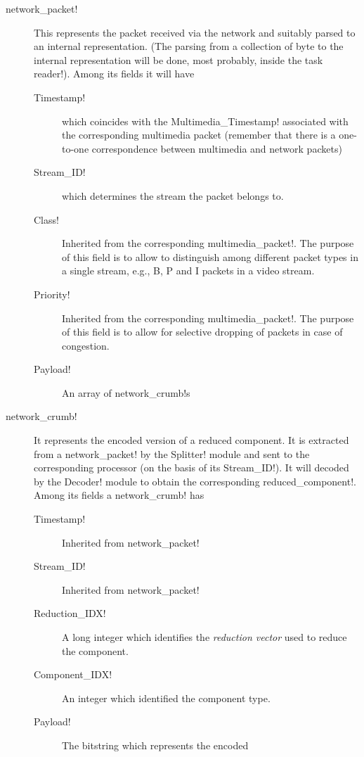 \documentclass{medusabook}
\begin{document}
\begin{description}
\item[\ttt network\_packet!]  This represents the packet received via
  the network and suitably parsed to an internal representation. (The
  parsing from a collection of byte to the internal representation
  will be done, most probably, inside the task \ttt reader!).  Among
  its fields it will have
  \begin{description}
    \item[\ttt Timestamp!] which coincides with the \ttt
    Multimedia\_Timestamp! associated with the corresponding
    multimedia packet (remember that there is a one-to-one
    correspondence between multimedia and network packets)
    \item[\ttt Stream\_ID!] which determines the stream the packet
    belongs to.
    \item[\ttt Class!] Inherited from the corresponding \ttt
    multimedia_packet!.  The purpose of this field is to allow to
    distinguish among different packet types in a single stream, e.g.,
    B, P and I packets in a video stream.
    \item[\ttt Priority!] Inherited from the corresponding \ttt
    multimedia_packet!.  The purpose of this field is to allow for
    selective dropping of packets in case of congestion.
    \item[\ttt Payload!] An array of \ttt network_crumb!s
  \end{description}
 \item[\ttt network\_crumb!] It represents the encoded version of a
 reduced component.  It is extracted from a \ttt network_packet! by
 the \ttt Splitter! module and sent to the corresponding processor (on
 the basis of its \ttt Stream_ID!).  It will decoded by the \ttt
 Decoder! module to obtain the corresponding \ttt
 reduced_component!. Among its fields a \ttt network_crumb! has
 \begin{description}
   \item[\ttt Timestamp!] Inherited from \ttt network_packet!
   \item[\ttt Stream\_ID!] Inherited from \ttt network_packet!
   \item[\ttt Reduction\_IDX!] A long integer which identifies
   the \emph{reduction vector} used to reduce the component.
   \item[\ttt Component\_IDX!] An integer which identified the
   component type.
   \item[\ttt Payload!] The bitstring which represents the encoded

\end{description}
\end{description}
\end{document}
